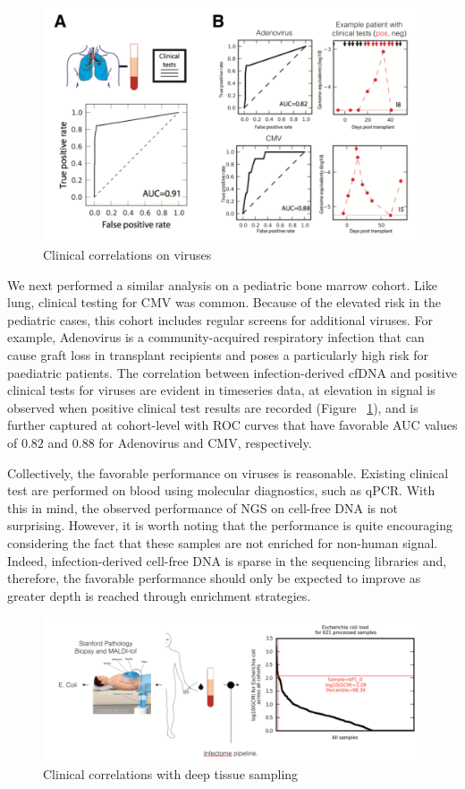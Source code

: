 \begin{figure}
\center\includegraphics[width=150mm,scale=0.5]{Figures/Fig9}
\caption{Clinical correlations on viruses}
\label{fig:Fig9}
\end{figure}

We next performed a similar analysis on a pediatric bone marrow cohort. Like lung, clinical testing for CMV was common. Because of the elevated risk in the pediatric cases, this cohort includes regular screens for additional viruses. For example, Adenovirus is a community-acquired respiratory infection that can cause graft loss in transplant recipients and poses a particularly high risk for paediatric patients. The correlation between infection-derived cfDNA and positive clinical tests for viruses are evident in timeseries data, at elevation in signal is observed when positive clinical test results are recorded (Figure ~\ref{fig:Fig9}), and is further captured at cohort-level with ROC curves that have favorable AUC values of $0.82$ and $0.88$ for Adenovirus and CMV, respectively. 

Collectively, the favorable performance on viruses is reasonable. Existing clinical test are performed on blood using molecular diagnostics, such as qPCR. With this in mind, the observed performance of NGS on cell-free DNA is not surprising. However, it is worth noting that the performance is quite encouraging considering the fact that these samples are not enriched for non-human signal. Indeed, infection-derived cell-free DNA is sparse in the sequencing libraries and, therefore, the favorable performance should only be expected to improve as greater depth is reached through enrichment strategies.

\begin{figure}
\center\includegraphics[width=150mm,scale=0.5]{Figures/Fig10}
\caption{Clinical correlations with deep tissue sampling}
\label{fig:Fig10}
\end{figure}

